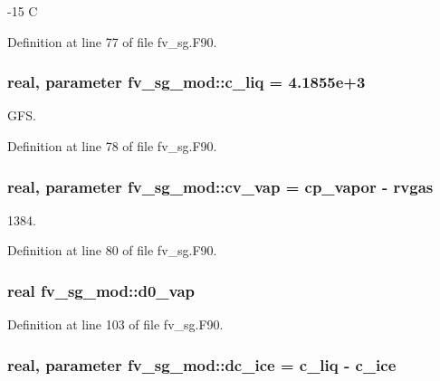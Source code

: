 -\/15 C 



Definition at line 77 of file fv\-\_\-sg.\-F90.

\subsubsection[{c\-\_\-liq}]{\setlength{\rightskip}{0pt plus 5cm}real, parameter fv\-\_\-sg\-\_\-mod\-::c\-\_\-liq = 4.\-1855e+3\hspace{0.3cm}{\ttfamily [private]}}\label{classfv__sg__mod_a410bbdf1e319c65ea3a200ce8aceda8a}


G\-F\-S. 



Definition at line 78 of file fv\-\_\-sg.\-F90.

\subsubsection[{cv\-\_\-vap}]{\setlength{\rightskip}{0pt plus 5cm}real, parameter fv\-\_\-sg\-\_\-mod\-::cv\-\_\-vap = cp\-\_\-vapor -\/ rvgas\hspace{0.3cm}{\ttfamily [private]}}\label{classfv__sg__mod_ab4b7454109972c7d688beea157f279a1}


1384. 



Definition at line 80 of file fv\-\_\-sg.\-F90.

\subsubsection[{d0\-\_\-vap}]{\setlength{\rightskip}{0pt plus 5cm}real fv\-\_\-sg\-\_\-mod\-::d0\-\_\-vap\hspace{0.3cm}{\ttfamily [private]}}\label{classfv__sg__mod_a0de1f9bda133c77954d9607a5833698a}


Definition at line 103 of file fv\-\_\-sg.\-F90.

\subsubsection[{dc\-\_\-ice}]{\setlength{\rightskip}{0pt plus 5cm}real, parameter fv\-\_\-sg\-\_\-mod\-::dc\-\_\-ice = {\bf c\-\_\-liq} -\/ {\bf c\-\_\-ice}\hspace{0.3cm}{\ttfamily [private]}}\label{classfv__sg__mod_a78cb86127e174c40e9c96f9ad386cd51}


